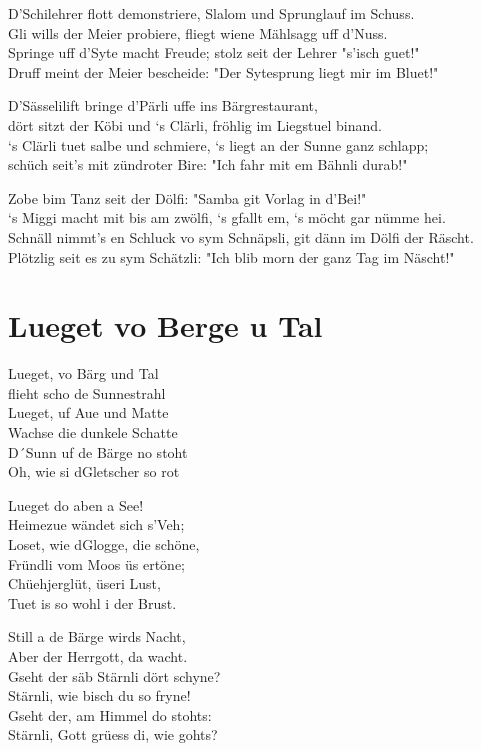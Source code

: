 \documentclass[
  letterpaper,
]{scrbook}
\begin{document}
D'Schilehrer flott demonstriere, Slalom und Sprunglauf im Schuss.\\
Gli wills der Meier probiere, fliegt wiene Mählsagg uff d'Nuss.\\
Springe uff d'Syte macht Freude; stolz seit der Lehrer "s'isch guet!"\\
Druff meint der Meier bescheide: "Der Sytesprung liegt mir im Bluet!"

D'Sässelilift bringe d'Pärli uffe ins Bärgrestaurant,\\
dört sitzt der Köbi und `s Clärli, fröhlig im Liegstuel binand.\\
`s Clärli tuet salbe und schmiere, `s liegt an der Sunne ganz schlapp;\\
schüch seit's mit zündroter Bire: "Ich fahr mit em Bähnli durab!"

Zobe bim Tanz seit der Dölfi: "Samba git Vorlag in d'Bei!"\\
`s Miggi macht mit bis am zwölfi, `s gfallt em, `s möcht gar nümme
hei.\\
Schnäll nimmt's en Schluck vo sym Schnäpsli, git dänn im Dölfi der
Räscht.\\
Plötzlig seit es zu sym Schätzli: "Ich blib morn der ganz Tag im
Näscht!"

\hypertarget{lueget-vo-berge-u-tal}{%
\chapter{Lueget vo Berge u Tal}\label{lueget-vo-berge-u-tal}}

Lueget, vo Bärg und Tal\\
flieht scho de Sunnestrahl\\
Lueget, uf Aue und Matte\\
Wachse die dunkele Schatte\\
D´Sunn uf de Bärge no stoht\\
Oh, wie si d\textquotesingle Gletscher so rot

Lueget do aben a See!\\
Heimezue wändet sich s'Veh;\\
Loset, wie d\textquotesingle Glogge, die schöne,\\
Fründli vom Moos üs ertöne;\\
Chüehjerglüt, üseri Lust,\\
Tuet is so wohl i der Brust.

Still a de Bärge wird\textquotesingle s Nacht,\\
Aber der Herrgott, da wacht.\\
Gseht der säb Stärnli dört schyne?\\
Stärnli, wie bisch du so fryne!\\
Gseht der, am Himmel do stoht\textquotesingle s:\\
Stärnli, Gott grüess di, wie goht\textquotesingle s?
\end{document}
